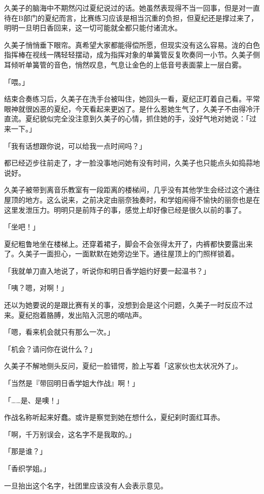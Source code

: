 \documentclass[UTF8]{ctexart}
\begin{document}
    久美子的脑海中不期然闪过夏纪说过的话。她虽然表现得不当一回事，但是对一直待在B部门的夏纪而言，比赛练习应该是相当沉重的负担，但夏纪还是撑过来了，明明一旦明日香回来，这一切可能就全都只能付诸流水。 

    久美子悄悄垂下眼帘。真希望大家都能得偿所愿，但现实没有这么容易。泷的白色指挥棒在视线一隅轻轻摆动，成为指挥对象的单簧管反复吹奏同一小节。久美子侧耳倾听单簧管的音色，悄然叹息，气息让金色的上低音号表面蒙上一层白雾。 

    「喂。」 

    结束合奏练习后，久美子在洗手台被叫住，她回头一看，夏纪正盯着自己看。平常眼神就很凶恶的夏纪，今天看起来更凶了。是什么惹她生气了，久美子不由得冷汗直流。夏纪貌似完全没注意到久美子的心情，抓住她的手，没好气地对她说：「过来一下。」 

    「我有话想跟你说，可以给我一点时间吗？」 

    都已经迈步往前走了，才一脸没事地问她有没有时间，久美子也只能点头如捣蒜地说好。 

    久美子被带到离音乐教室有一段距离的楼梯间，几乎没有其他学生会经过这个通往屋顶的地方。这么说来，之前决定由丽奈独奏时，和学姐闹得不愉快的丽奈也是在这里发泄压力。明明只是前阵子的事，感觉上却好像已经是很久以前的事了。 

    「坐吧！」 

    夏纪粗鲁地坐在楼梯上。还穿着裙子，脚会不会张得太开了，内裤都快要露出来了。久美子一面担心，一面默默在她旁边坐下。通往屋顶上的门照样锁着。 

    「我就单刀直入地说了，听说你和明日香学姐约好要一起温书？」 

    「咦？嗯，对啊！」 

    还以为她要说的是跟比赛有关的事，没想到会是这个问题，久美子一时反应不过来。夏纪抱着胳膊，发出陷入沉思的嘀咕声。 

    「嗯，看来机会就只有那么一次。」 

    「机会？请问你在说什么？」 

    久美子不解地侧头反问，夏纪一脸错愕，脸上写着「这家伙也太状况外了」。 

    「当然是『带回明日香学姐大作战』啊！」 

    「……是、是噢！」 

    作战名称听起来好蠢。或许是察觉到她在想什么，夏纪刹时面红耳赤。 

    「啊，千万别误会，这名字不是我取的。」 

    「那是谁？」 

    「香织学姐。」 

    一旦抬出这个名字，社团里应该没有人会表示意见。 
\end{document}

